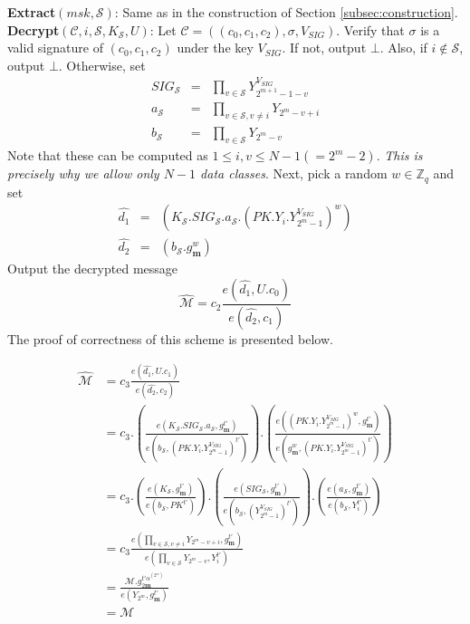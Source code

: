 \noindent \textbf{Extract}$(msk,\mathcal{S})$: Same as in the construction of Section \ref{subsec:construction}.\\
 
\noindent \textbf{Decrypt}$(\mathcal{C},i,\mathcal{S},K_{\mathcal{S}},U)$: Let $\mathcal{C}=((c_0,c_1,c_2),\sigma,V_{SIG})$. Verify that $\sigma$ is a valid signature of $(c_0,c_1,c_2)$ under the key $V_{SIG}$. If not, output $\bot$. Also, if $i\notin\mathcal{S}$, output $\bot$. Otherwise, set 
\begin{eqnarray}
  SIG_{\mathcal{S}} &=& \prod_{v\in\mathcal{S}}Y^{V_{SIG}}_{2^{m+1}-1-v}\nonumber\\
  a_{\mathcal{S}} &=& \prod_{v\in\mathcal{S},v\neq i}Y_{2^m-v+i}\nonumber\\
  b_{\mathcal{S}} &=& \prod_{v\in\mathcal{S}}Y_{2^m-v}\nonumber  
\end{eqnarray}
\noindent Note that these can be computed as $1\leq i,v \leq N-1(=2^m-2)$. \emph{This is precisely why we allow only $N-1$ data classes}.  Next, pick a random $w\in \mathbb{Z}_q$ and set
 \begin{eqnarray}
  \hat{d_1} &=& (K_{\mathcal{S}}.SIG_{\mathcal{S}}.a_{\mathcal{S}}.(PK.Y_i.Y^{V_{SIG}}_{2^m-1})^w)\nonumber\\
  \hat{d_2} &=& (b_{\mathcal{S}}.g^w_{\mathbf{m}}) \nonumber
 \end{eqnarray}
 \noindent Output the decrypted message 
 \begin{equation}
  \hat{\mathcal{M}} = c_2\frac{{e}(\hat{d_1},U.c_0)}{{e}(\hat{d_2},c_1)}\nonumber
 \end{equation}
\noindent The proof of correctness of this scheme is presented below.

\begin{equation}
\begin{split}
 \hat{\mathcal{M}} &= c_3\frac{{e}(\hat{d_1},U.c_1)}{{e}(\hat{d_2},c_2)}\\
 &= c_3.\left(\frac{e\left(K_{\mathcal{S}}.SIG_{\mathcal{S}}.a_{\mathcal{S}},g^{t'}_{\mathbf{m}}\right)}{e\left(b_{\mathcal{S}},(PK.Y_i.Y^{V_{SIG}}_{2^m-1})^{t'}\right)}\right).\left(\frac{e\left(\left(PK.Y_i.Y^{V_{SIG}}_{2^m-1}\right)^w,g^{t'}_{\mathbf{m}}\right)}{e\left(g^w_{\mathbf{m}},(PK.Y_i.Y^{V_{SIG}}_{2^m-1})^{t'}\right)}\right)\\
 &=c_3.\left(\frac{e\left(K_{\mathcal{S}},g^{t'}_{\mathbf{m}}\right)}{e\left(b_{\mathcal{S}},PK^{t'}\right)}\right).\left(\frac{e\left(SIG_{\mathcal{S}},g^{t'}_{\mathbf{m}}\right)}{e\left(b_{\mathcal{S}},\left(Y^{V_{SIG}}_{2^m-1}\right)^{t'}\right)}\right).\left(\frac{e\left(a_{\mathcal{S}},g^{t'}_{\mathbf{m}}\right)}{e\left(b_{\mathcal{S}},Y^{t'}_i\right)}\right)\\
 &=c_3\frac{e(\prod_{v\in\mathcal{S},v\neq i}Y_{2^m-v+i},g^{t'}_{\mathbf{m}})}{e(\prod_{v\in\mathcal{S}}Y_{2^m-v},Y_i^{t'})}\\
 &=\frac{\mathcal{M}.g^{t'\alpha^{(2^m)}}_{2\mathbf{m}}}{e(Y_{2^m},g^{t'}_{\mathbf{m}})}\\
 &=\mathcal{M}\nonumber
\end{split}
\end{equation}

